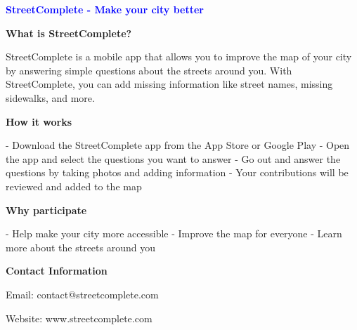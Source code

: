 \documentclass[a5paper,twocolumn]{article}
\begin{document}
\begin{center}


\vspace{1cm}

{\Large\textbf{\textcolor{blue}{StreetComplete - Make your city better}}}

\vspace{0.5cm}

{\large\textbf{What is StreetComplete?}}

\vspace{0.5cm}

StreetComplete is a mobile app that allows you to improve the map of your city by answering simple questions about the streets around you. With StreetComplete, you can add missing information like street names, missing sidewalks, and more.

\vspace{1cm}

{\large\textbf{How it works}}

\vspace{0.5cm}

- Download the StreetComplete app from the App Store or Google Play
- Open the app and select the questions you want to answer
- Go out and answer the questions by taking photos and adding information
- Your contributions will be reviewed and added to the map
\end{center}

\begin{flushright}
{\large\textbf{Why participate}}

\vspace{0.5cm}

- Help make your city more accessible
- Improve the map for everyone
- Learn more about the streets around you
\vspace{1cm}

{\large\textbf{Contact Information}}

\vspace{0.5cm}

Email: contact@streetcomplete.com

Website: www.streetcomplete.com
\end{flushright}
\end{document}
